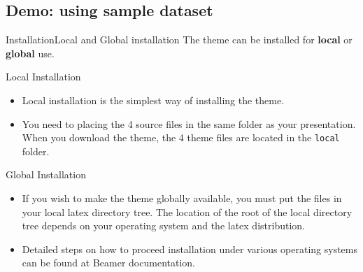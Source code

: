 \documentclass[10pt]{beamer}
\begin{document}
\subsection{Demo: using sample dataset}
\begin{frame}{Installation}{Local and Global installation}
  The theme can be installed for \textbf{local} or \textbf{global} use.
  \pause
  \begin{block}{Local Installation}
  \begin{itemize}
    \item Local installation is the simplest way of installing the theme.
    \item You need to placing the 4 source files in the same folder as your presentation. When you download the theme, the 4 theme files are located in the {\tt local} folder.
  \end{itemize}
  \end{block}

  \begin{block}{Global Installation}
  \begin{itemize}
     \item If you wish to make the theme globally available, you must put the files in your local latex directory tree. The location of the root of the local directory tree depends on your operating system and the latex distribution.
     \item Detailed steps on how to proceed installation under various operating systems can be found at Beamer documentation.
  \end{itemize}
  \end{block}
\end{frame}


\end{document}
